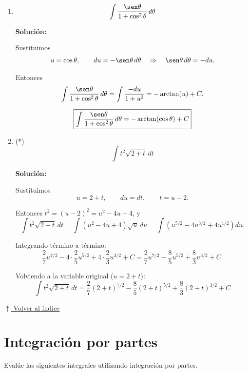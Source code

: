 \documentclass[12pt]{article}
\newcommand{\solucion}{%
    \vspace{0.8em}%
    \textbf{Solución:}%
}
\newcommand{\volverindice}{%
    \vspace{1em}%
    \begin{flushright}%
        \hyperlink{indice}{\small $\uparrow$ Volver al índice}%
    \end{flushright}%
}
\begin{document}
\begin{enumerate}[label=\alph*.-]
    \item
    \[
    \int\frac{\sen\theta}{1+\cos^2\theta}\,d\theta
    \]

    \solucion

    Sustituimos
    \[
    u=\cos\theta,\qquad du=-\sen\theta\,d\theta\quad\Rightarrow\quad \sen\theta\,d\theta=-du.
    \]

    Entonces
    \[
    \int\frac{\sen\theta}{1+\cos^2\theta}\,d\theta=\int\frac{-du}{1+u^2}
    =-\arctan(u)+C.
    \]

    \[
    \boxed{
    \int\frac{\sen\theta}{1+\cos^2\theta}\,d\theta=-\arctan(\cos\theta)+C
    }
    \]


    \item (*)
    \[
    \int t^2\sqrt{2+t}\,dt
    \]

    \solucion

    Sustituimos
    \[
    u=2+t,\qquad du=dt,\qquad t=u-2.
    \]

    Entonces $t^2=(u-2)^2=u^2-4u+4$, y
    \[
    \int t^2\sqrt{2+t}\,dt=\int(u^2-4u+4)\sqrt{u}\,du
    =\int\left(u^{5/2}-4u^{3/2}+4u^{1/2}\right)du.
    \]

    Integrando término a término:
    \[
    \frac{2}{7}u^{7/2}-4\cdot\frac{2}{5}u^{5/2}+4\cdot\frac{2}{3}u^{3/2}+C
    =\frac27u^{7/2}-\frac85u^{5/2}+\frac83u^{3/2}+C.
    \]

    Volviendo a la variable original ($u=2+t$):
    \[
    \boxed{
    \int t^2\sqrt{2+t}\,dt
    =\frac27(2+t)^{7/2}-\frac85(2+t)^{5/2}+\frac83(2+t)^{3/2}+C
    }
    \]

\end{enumerate}

\volverindice
\newpage


\section{Integración por partes}

Evalúe las siguientes integrales utilizando integración por partes.
\end{document}

